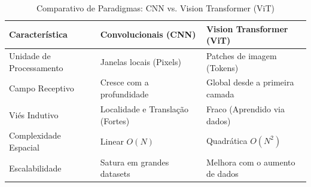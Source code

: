 \begin{table}[ht]
\centering
\caption{Comparativo de Paradigmas: CNN vs. Vision Transformer (ViT)}
\label{tab:cnn_vs_vit}
\begin{tabular}{@{}lll@{}}
\toprule
\textbf{Característica} & \textbf{Convolucionais (CNN)} & \textbf{Vision Transformer (ViT)} \\ \midrule
Unidade de Processamento & Janelas locais (Pixels) & Patches de imagem (Tokens) \\
Campo Receptivo & Cresce com a profundidade & Global desde a primeira camada \\
Viés Indutivo & Localidade e Translação (Fortes) & Fraco (Aprendido via dados) \\
Complexidade Espacial & Linear $O(N)$ & Quadrática $O(N^2)$ \\
Escalabilidade & Satura em grandes datasets & Melhora com o aumento de dados \\ \bottomrule
\end{tabular}
\end{table}